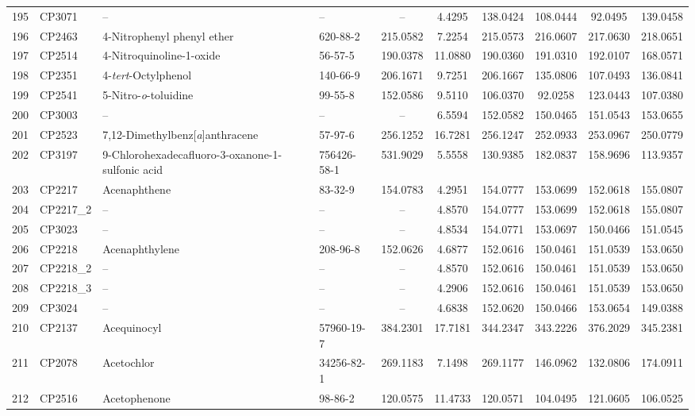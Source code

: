 \begin{longtable}{clllcccccc}
195 & CP3071 & – & – & – & 4.4295 & 138.0424 & 108.0444 & 92.0495 & 139.0458 \\ 
196 & CP2463 & 4-Nitrophenyl phenyl ether & 620-88-2 & 215.0582 & 7.2254 & 215.0573 & 216.0607 & 217.0630 & 218.0651 \\ 
197 & CP2514 & 4-Nitroquinoline-1-oxide\smash{\textsuperscript{\textdaggerdbl}} & 56-57-5 & 190.0378 & 11.0880 & 190.0360 & 191.0310 & 192.0107 & 168.0571 \\ 
198 & CP2351 & 4-\textit{tert}-Octylphenol & 140-66-9 & 206.1671 & 9.7251 & 206.1667 & 135.0806 & 107.0493 & 136.0841 \\ 
199 & CP2541 & 5-Nitro-\textit{o}-toluidine & 99-55-8 & 152.0586 & 9.5110 & 106.0370 & 92.0258 & 123.0443 & 107.0380 \\ 
200 & CP3003 & – & – & – & 6.5594 & 152.0582 & 150.0465 & 151.0543 & 153.0655 \\ 
201 & CP2523 & 7,12-Dimethylbenz[\textit{a}]anthracene & 57-97-6 & 256.1252 & 16.7281 & 256.1247 & 252.0933 & 253.0967 & 250.0779 \\ 
202 & CP3197 & 9-Chlorohexadecafluoro-3-oxanone-1-sulfonic acid & 756426-58-1 & 531.9029 & 5.5558 & 130.9385 & 182.0837 & 158.9696 & 113.9357 \\ 
203 & CP2217 & Acenaphthene & 83-32-9 & 154.0783 & 4.2951 & 154.0777 & 153.0699 & 152.0618 & 155.0807 \\ 
204 & CP2217\_2 & – & – & – & 4.8570 & 154.0777 & 153.0699 & 152.0618 & 155.0807 \\ 
205 & CP3023 & – & – & – & 4.8534 & 154.0771 & 153.0697 & 150.0466 & 151.0545 \\ 
206 & CP2218 & Acenaphthylene & 208-96-8 & 152.0626 & 4.6877 & 152.0616 & 150.0461 & 151.0539 & 153.0650 \\ 
207 & CP2218\_2 & – & – & – & 4.8570 & 152.0616 & 150.0461 & 151.0539 & 153.0650 \\ 
208 & CP2218\_3 & – & – & – & 4.2906 & 152.0616 & 150.0461 & 151.0539 & 153.0650 \\ 
209 & CP3024 & – & – & – & 4.6838 & 152.0620 & 150.0466 & 153.0654 & 149.0388 \\ 
210 & CP2137 & Acequinocyl & 57960-19-7 & 384.2301 & 17.7181 & 344.2347 & 343.2226 & 376.2029 & 345.2381 \\ 
211 & CP2078 & Acetochlor & 34256-82-1 & 269.1183 & 7.1498 & 269.1177 & 146.0962 & 132.0806 & 174.0911 \\ 
212 & CP2516 & Acetophenone\smash{\textsuperscript{\textdaggerdbl}} & 98-86-2 & 120.0575 & 11.4733 & 120.0571 & 104.0495 & 121.0605 & 106.0525 \\ 

\end{longtable}
